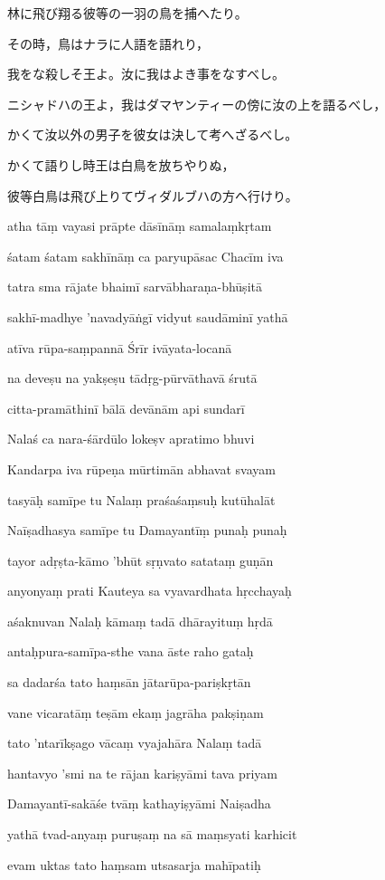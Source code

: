 林に飛び翔る彼等の一羽の鳥を捕へたり。

その時，鳥はナラに人語を語れり，

我をな殺しそ王よ。汝に我はよき事をなすべし。

ニシャドハの王よ，我はダマヤンティーの傍に汝の上を語るべし，

かくて汝以外の男子を彼女は決して考へざるべし。

かくて語りし時王は白鳥を放ちやりぬ，

彼等白鳥は飛び上りてヴィダルブハの方へ行けり。

\newpage

atha tāṃ vayasi prāpte dāsīnāṃ samalaṃkṛtam \da

śatam śatam sakhīnāṃ ca paryupāsac Chacīm iva \dd

tatra sma rājate bhaimī sarvābharaṇa-bhūṣitā \da

sakhī-madhye 'navadyāṅgī vidyut saudāminī yathā \dd

atīva rūpa-saṃpannā Śrīr ivāyata-locanā \da

na deveṣu na yakṣeṣu tādṛg-pūrvāthavā śrutā \da

citta-pramāthinī bālā devānām api sundarī \dd

Nalaś ca nara-śārdūlo lokeṣv apratimo bhuvi \da

Kandarpa iva rūpeṇa mūrtimān abhavat svayam \dd

tasyāḥ samīpe tu Nalaṃ praśaśaṃsuḥ kutūhalāt \da

Naīṣadhasya samīpe tu Damayantīṃ punaḥ punaḥ \dd

tayor adṛṣta-kāmo 'bhūt sṛṇvato satataṃ guṇān \da

anyonyaṃ prati Kauteya sa vyavardhata hṛcchayaḥ \dd

aśaknuvan Nalaḥ kāmaṃ tadā dhārayituṃ hṛdā \da

antaḥpura-samīpa-sthe vana āste raho gataḥ \dd

sa dadarśa tato haṃsān jātarūpa-pariṣkṛtān \da

vane vicaratāṃ teṣām ekaṃ jagrāha pakṣiṇam \dd

tato 'ntarīkṣago vācaṃ vyajahāra Nalaṃ tadā \da

hantavyo 'smi na te rājan kariṣyāmi tava priyam \dd

Damayantī-sakāśe tvāṃ kathayiṣyāmi Naiṣadha \da

yathā tvad-anyaṃ puruṣaṃ na sā maṃsyati karhicit \dd

evam uktas tato haṃsam utsasarja mahīpatiḥ \da

